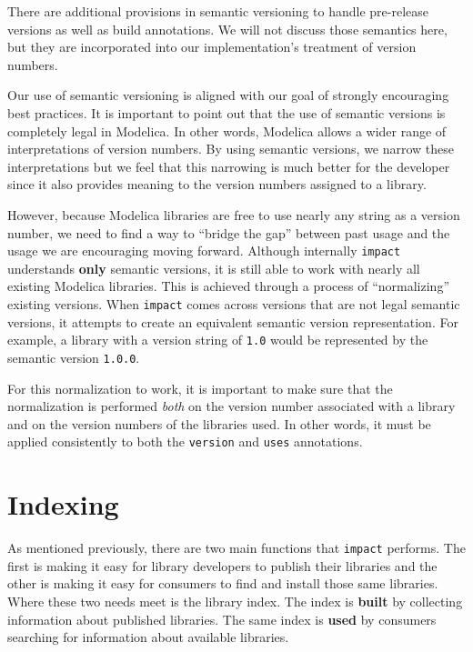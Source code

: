 \documentclass[11pt,a4paper,twocolumn]{article}
\newcommand{\code}[1]{\texttt{#1}} %
\begin{document}
There are additional provisions in semantic versioning to handle
pre-release versions as well as build annotations.  We will not
discuss those semantics here, but they are incorporated into our
implementation's treatment of version numbers.

Our use of semantic versioning is aligned with our goal of strongly
encouraging best practices.  It is important to point out that the use
of semantic versions is completely legal in Modelica.  In other words,
Modelica allows a wider range of interpretations of version numbers.
By using semantic versions, we narrow these interpretations but we
feel that this narrowing is much better for the developer since it
also provides meaning to the version numbers assigned to a library.

However, because Modelica libraries are free to use nearly any string
as a version number, we need to find a way to ``bridge the gap''
between past usage and the usage we are encouraging moving forward.
Although internally \code{impact} understands \textbf{only} semantic
versions, it is still able to work with nearly all existing Modelica
libraries.  This is achieved through a process of ``normalizing''
existing versions.  When \code{impact} comes across versions that are
not legal semantic versions, it attempts to create an equivalent
semantic version representation.  For example, a library with a
version string of \code{1.0} would be represented by the semantic
version \code{1.0.0}.

For this normalization to work, it is important to make sure that the
normalization is performed \emph{both} on the version number associated
with a library and on the version numbers of the libraries used.  In
other words, it must be applied consistently to both the
\code{version} and \code{uses} annotations.

\section{Indexing}

As mentioned previously, there are two main functions that
\code{impact} performs.  The first is making it easy for library
developers to publish their libraries and the other is making it easy
for consumers to find and install those same libraries.  Where these
two needs meet is the library index.  The index is \textbf{built} by
collecting information about published libraries.  The same index is
\textbf{used} by consumers searching for information about available
libraries.
\end{document}
